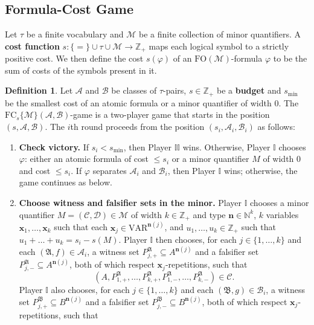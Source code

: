 \documentclass{article}
\theoremstyle{definition}
\newtheorem{definition}[theorem]{Definition}
\begin{document}
\subsection{Formula-Cost Game}

Let $\tau$ be a finite vocabulary and $\mathcal{M}$ be a finite collection of minor quantifiers. A \textbf{cost function} $s:\{=\}\cup\tau\cup\mathcal{M}\to\mathbb{Z}_+$ maps each logical symbol to a strictly positive cost. We then define the cost $s(\varphi)$ of an $\mathrm{FO}(\mathcal{M})$-formula $\varphi$ to be the sum of costs of the symbols present in it.

\begin{definition}
    Let $\mathcal{A}$ and $\mathcal{B}$ be classes of $\tau$-pairs, $s \in \mathbb{Z}_+$ be a \textbf{budget} and $s_{\min}$ be the smallest cost of an atomic formula or a minor quantifier of width $0$. The $\mathrm{FC}_{s}\{\mathcal{M}\}(\mathcal{A},\mathcal{B})$-game is a two-player game that starts in the position $(s,\mathcal{A},\mathcal{B})$. The $i$th round proceeds from the position $(s_i,\mathcal{A}_i,\mathcal{B}_i)$ as follows:
    \begin{enumerate}
        \item \textbf{Check victory.} If $s_i<s_{\min}$, then Player $\mathbb{II}$ wins. Otherwise, Player $\mathbb{I}$ chooses $\varphi$: either an atomic formula of cost $\leq s_i$ or a minor quantifier $M$ of width $0$ and cost $\leq s_i$. If $\varphi$ separates $\mathcal{A}_i$ and $\mathcal{B}_i$, then Player $\mathbb{I}$ wins; otherwise, the game continues as below.
        \item \textbf{Choose witness and falsifier sets in the minor.} Player $\mathbb{I}$ chooses a minor quantifier $M=(\mathcal{C},\mathcal{D})\in\mathcal{M}$ of width $k\in\mathbb{Z}_+$ and type $\textbf{n}\in \mathbb{N}^k$, $k$ variables $\textbf{x}_1,\dots,\textbf{x}_k$ such that each $\textbf{x}_j\in \text{VAR}^{\textbf{n}(j)}$, and $u_1,\dots,u_k\in\mathbb{Z}_+$ such that $u_1+\dots+u_k=s_i-s(M)$. Player $\mathbb{I}$ then chooses, for each $j\in\{1,\dots,k\}$ and each $(\mathfrak{A},f)\in\mathcal{A}_i$, a witness set $P^{\mathfrak{A}}_{j,+}\subseteq A^{\textbf{n}(j)}$ and a falsifier set $P^{\mathfrak{A}}_{j,-}\subseteq A^{\textbf{n}(j)}$, both of which respect $\textbf{x}_j$-repetitions, such that 
        \[
            (A,P^{\mathfrak{A}}_{1,+},\dots,P^{\mathfrak{A}}_{k,+},P^\mathfrak{A}_{1,-},\dots,P^\mathfrak{A}_{k,-})\in \mathcal{C}.
        \]
        Player $\mathbb{I}$ also chooses, for each $j\in\{1,\dots,k\}$ and each $(\mathfrak{B},g)\in\mathcal{B}_i$, a witness set $P^{\mathfrak{B}}_{j,+}\subseteq B^{\textbf{n}(j)}$ and a falsifier set $P^{\mathfrak{B}}_{j,-}\subseteq B^{\textbf{n}(j)}$, both of which respect $\textbf{x}_j$-repetitions, such that 

\end{enumerate}
\end{definition}
\end{document}
